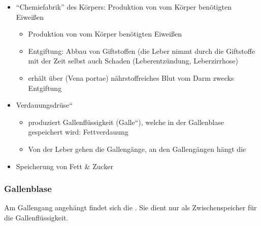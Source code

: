 \gMarried
{

\begin{itemize}
\item "`Chemiefabrik"' des Körpers: Produktion von vom
    Körper benötigten Eiweißen
    \begin{itemize}
        \item Produktion von vom
    Körper benötigten Eiweißen
    \item Entgiftung: Abbau von Giftstoffen (die Leber nimmt
    durch die Giftstoffe mit der Zeit selbst auch Schaden
    (Leberentzündung, Leberzirrhose)
    \item erhält über 
    (Vena portae) nährstoffreiches Blut vom Darm zwecks Entgiftung   
\end{itemize}
    \item {\quotedblbase}Verdauungsdrüse{\textquotedblleft}
    \begin{itemize}
        \item produziert Gallenflüssigkeit
        ({\quotedblbase}Galle{\textquotedblleft}), welche in der Gallenblase
        gespeichert wird: Fettverdauung
        \item Von der Leber gehen die Gallengänge, an den Gallengängen
        hängt die
    \end{itemize}
    \item Speicherung von Fett \& Zucker
    
\end{itemize}}
{


}

\subsubsection{Gallenblase}
\label{topic:gallenblase}

Am Gallengang angehängt findet sich die .
Sie dient nur als Zwischenspeicher für die Gallenflüssigkeit.





{


}


